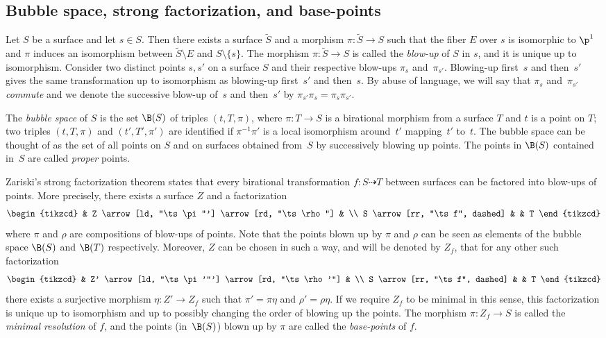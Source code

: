 \subsection{Bubble space, strong factorization, and base-points}
Let $S$ be a surface and let $s\in S$. Then there exists a surface $\tilde S$ and a morphism $\pi\colon\tilde S\to S$ such that the fiber $E$ over $s$ is isomorphic to $\p^1$ and $\pi$ induces an isomorphism between $\tilde S\setminus E$ and $S\setminus\{s\}$. The morphism $\pi\colon \tilde S\to S$ is called the \emph{blow-up} of $S$ in $s$, and it is unique up to isomorphism. Consider two distinct points $s,s'$ on a surface $S$ and their respective blow-ups $\pi_{s}$ and~$\pi_{s'}$. Blowing-up first~$s$ and then~$s'$ gives the same transformation up to isomorphism as blowing-up first~$s'$ and then~$s$. By abuse of language, we will say that $\pi_s$ and~$\pi_{s'}$ \emph{commute} and we denote the successive blow-up of~$s$ and then~$s'$ by $\pi_{s'}\pi_s=\pi_s\pi_{s'}$.

The \emph{bubble space} of $S$ is the set $\B(S)$ of triples $(t,T,\pi)$, where $\pi\colon T\to S$ is a birational morphism from a surface $T$ and $t$ is a point on $T$; two triples $(t,T,\pi)$ and $(t', T',\pi')$ are identified if $\pi^{-1}\pi'$ is a local isomorphism around~$t'$ mapping~$t'$ to~$t$. The bubble space can be thought of as the set of all points on $S$ and on surfaces obtained from~$S$ by successively blowing up points. The points in $\B(S)$ contained in~$S$ are called \emph{proper} points.

Zariski's strong factorization theorem states that every birational transformation $f\colon S\dashrightarrow T$ between surfaces can be factored into blow-ups of points. More precisely, there exists a surface $Z$ and a factorization
\[
\begin{tikzcd}
& Z \arrow[ld, "\ts\pi"'] \arrow[rd, "\ts\rho"] & \\
S \arrow[rr, "\ts f", dashed] & & T
\end{tikzcd}
\]
where $\pi$ and $\rho$ are compositions of blow-ups of points. Note that the points blown up by $\pi$ and $\rho$ can be seen as elements of the bubble space $\B( S)$ and $\B( T)$ respectively. Moreover, $Z$ can be chosen in such a way, and will be denoted by $Z_f$, that for any other such factorization
\[
\begin{tikzcd}
& Z' \arrow[ld, "\ts\pi'"'] \arrow[rd, "\ts\rho'"] & \\
S \arrow[rr, "\ts f", dashed] & & T
\end{tikzcd}
\]
there exists a surjective morphism $\eta\colon Z'\to Z_f$ such that $\pi'=\pi\eta$ and $\rho'=\rho\eta$. If we require $Z_f$ to be minimal in this sense, this factorization is unique up to isomorphism and up to possibly changing the order of blowing up the points. {The morphism $\pi\colon Z_f\to S$ is called the \emph{minimal resolution} of $f$}, and the points (in~$\B(S)$) blown up by $\pi$ are called the \emph{base-points} of $f$.

